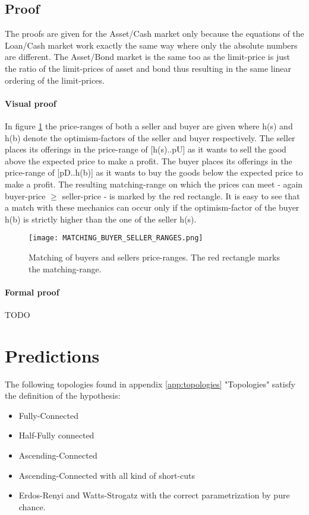 \documentclass[Bachelorarbeit.tex]{subfiles}
\begin{document}
\subsection{Proof}
The proofs are given for the Asset/Cash market only because the equations of the Loan/Cash market work exactly the same way where only the absolute numbers are different. The Asset/Bond market is the same too as the limit-price is just the ratio of the limit-prices of asset and bond thus resulting in the same linear ordering of the limit-prices.

\paragraph{Visual proof}
In figure \ref{fig:MATCHING_BUYER_SELLER_RANGES} the price-ranges of both a seller and buyer are given where h(s) and h(b) denote the optimism-factors of the seller and buyer respectively. The seller places its offerings in the price-range of [h(s)..pU] as it wants to sell the good above the expected price to make a profit. The buyer places its offerings in the price-range of [pD..h(b)] as it wants to buy the goods below the expected price to make a profit. The resulting matching-range on which the prices can meet - again buyer-price $\geq$ seller-price - is marked by the red rectangle. It is easy to see that a match with these mechanics can occur only if the optimism-factor of the buyer h(b) is strictly higher than the one of the seller h(s).

\begin{figure}[H]
	\centering
  \texttt{[image: MATCHING\_BUYER\_SELLER\_RANGES.png]}
  	\caption{Matching of buyers and sellers price-ranges. The red rectangle marks the matching-range.}
	\label{fig:MATCHING_BUYER_SELLER_RANGES}
\end{figure}

\paragraph{Formal proof}
TODO

\section{Predictions}
The following topologies found in appendix \ref{app:topologies} "Topologies" satisfy the definition of the hypothesis:
 
\begin{itemize}
\item Fully-Connected
\item Half-Fully connected
\item Ascending-Connected
\item Ascending-Connected with all kind of short-cuts
\item Erdos-Renyi and Watts-Strogatz with the correct parametrization by pure chance.
\end{itemize}
\end{document}
